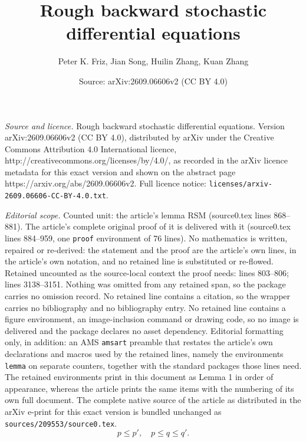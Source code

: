 \documentclass[10pt,a4paper]{amsart}
\title{Rough backward stochastic differential equations}
\author{Peter K. Friz, Jian Song, Huilin Zhang, Kuan Zhang}
\date{Source: arXiv:2609.06606v2 (CC BY 4.0)}
\begin{document}
\maketitle

\noindent\emph{Source and licence.} Rough backward stochastic differential equations. Version arXiv:2609.06606v2 (CC BY 4.0), distributed by arXiv under the Creative Commons Attribution 4.0 International licence, http://creativecommons.org/licenses/by/4.0/, as recorded in the arXiv licence metadata for this exact version and shown on the abstract page https://arxiv.org/abs/2609.06606v2. Full licence notice: \texttt{licenses/arxiv-2609.06606-CC-BY-4.0.txt}.\par\smallskip

\noindent\textit{Editorial scope.} Counted unit: the article's lemma RSM (source0.tex lines 868--881). The article's complete original proof of it is delivered with it (source0.tex lines 884--959, one \texttt{proof} environment of 76 lines). No mathematics is written, repaired or re-derived: the statement and the proof are the article's own lines, in the article's own notation, and no retained line is substituted or re-flowed.  Retained uncounted as the source-local context the proof needs: lines 803--806; lines 3138--3151.  Nothing was omitted from any retained span, so the package carries no omission record.  No retained line contains a citation, so the wrapper carries no bibliography and no bibliography entry.  No retained line contains a figure environment, an image-inclusion command or drawing code, so no image is delivered and the package declares no asset dependency.  Editorial formatting only, in addition: an AMS \texttt{amsart} preamble that restates the article's own declarations and macros used by the retained lines, namely the environments \texttt{lemma} on separate counters, together with the standard packages those lines need.  The retained environments print in this document as Lemma 1 in order of appearance, whereas the article prints the same items with the numbering of its own full document.  The complete native source of the article as distributed in the arXiv e-print for this exact version is bundled unchanged as \texttt{sources/209553/source0.tex}.
\begin{equation}
\label{cond31}
p\le p', \quad p\le q \le q'.
\end{equation}
\end{document}
